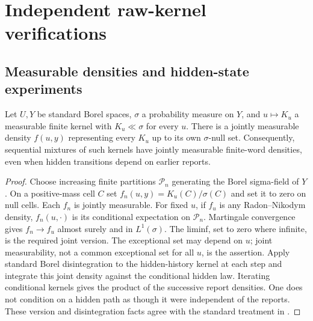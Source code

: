 \section{Independent raw-kernel verifications}\label{sec:realizations}
\subsection{Measurable densities and hidden-state experiments}
\begin{lemma}\label{lem:rn}
Let $U,Y$ be standard Borel spaces, $\sigma$ a probability measure on $Y$, and $u\mapsto K_u$ a measurable finite kernel with $K_u\ll\sigma$ for every $u$. There is a jointly measurable density $f(u,y)$ representing every $K_u$ up to its own $\sigma$-null set. Consequently, sequential mixtures of such kernels have jointly measurable finite-word densities, even when hidden transitions depend on earlier reports.
\end{lemma}
\begin{proof}
Choose increasing finite partitions $\mathcal P_n$ generating the Borel sigma-field of $Y$. On a positive-mass cell $C$ set
$f_n(u,y)=K_u(C)/\sigma(C)$ and set it to zero on null cells. Each $f_n$ is jointly measurable. For fixed $u$, if $f_u$ is any Radon--Nikodym density, $f_n(u,\cdot)$ is its conditional expectation on $\mathcal P_n$. Martingale convergence gives $f_n\to f_u$ almost surely and in $L^1(\sigma)$. The liminf, set to zero where infinite, is the required joint version. The exceptional set may depend on $u$; joint measurability, not a common exceptional set for all $u$, is the assertion. Apply standard Borel disintegration to the hidden-history kernel at each step and integrate this joint density against the conditional hidden law. Iterating conditional kernels gives the product of the successive report densities. One does not condition on a hidden path as though it were independent of the reports. These version and disintegration facts agree with the standard treatment in \cite{Kallenberg,BertsekasShreve}.
\end{proof}

